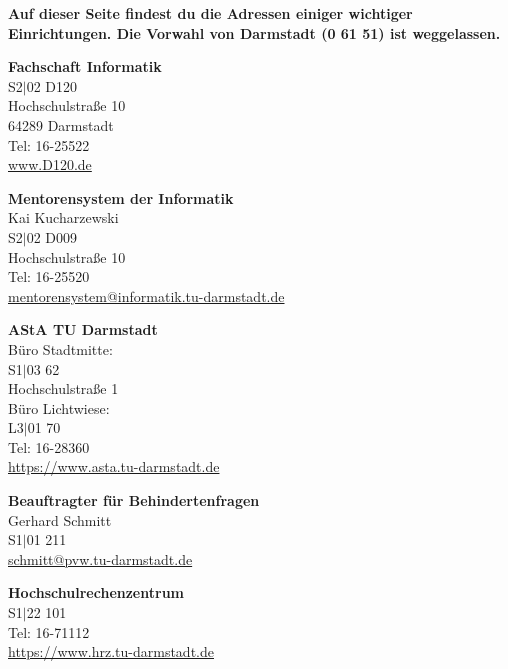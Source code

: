 
\textbf{Auf dieser Seite findest du die Adressen einiger wichtiger Einrichtungen. Die Vorwahl von Darmstadt (0 61 51) ist weggelassen.}

\begin{multicols}{2}

    \textbf{Fachschaft Informatik}\\
    S2$|$02 D120\\
    Hochschulstraße 10\\
    64289 Darmstadt\\
    Tel: 16-25522\\
    \url{www.D120.de}

    \vspace{3mm}
    \textbf{Mentorensystem der Informatik}\\
    Kai Kucharzewski\\
    S2$|$02 D009\\
    Hochschulstraße 10\\
    Tel: 16-25520\\
    \href{mailto:mentorensystem@informatik.tu-darmstadt.de}{mentorensystem@informatik.tu-darmstadt.de}

    \vspace{3mm}
    \textbf{AStA TU Darmstadt}\\
    Büro Stadtmitte:\\
    S1$|$03 62\\
    Hochschulstraße 1\\
    Büro Lichtwiese:\\
    L3$|$01 70\\
    Tel: 16-28360\\
    \url{https://www.asta.tu-darmstadt.de}

    \vspace{3mm}
    \textbf{Beauftragter für Behindertenfragen}\\
    Gerhard Schmitt\\
    S1$|$01 211\\
    \href{mailto:schmitt@pvw.tu-darmstadt.de}{schmitt@pvw.tu-darmstadt.de}

    \vspace{3mm}
    \textbf{Hochschulrechenzentrum}\\
    S1$|$22 101\\
    Tel: 16-71112\\
    \url{https://www.hrz.tu-darmstadt.de}


    \


\end{multicols}

